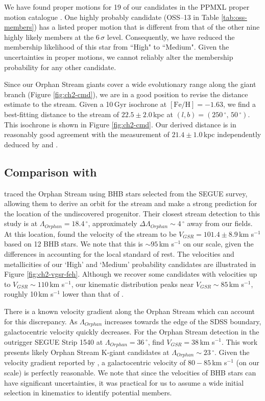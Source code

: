 We have found proper motions for 19 of our candidates in the PPMXL proper motion catalogue \citep{Roeser_et-al_2010}. One highly probably candidate (OSS--13 in Table \ref{tab:oss-members}) has a listed proper motion that is different from that of the other nine highly likely members at the $6\,\sigma$ level. Consequently, we have reduced the membership likelihood of this star from ``High" to ``Medium". Given the uncertainties in proper motions, we cannot reliably alter the membership probability for any other candidate.

Since our Orphan Stream giants cover a wide evolutionary range along the giant branch (Figure \ref{fig:ch2-cmd}), we are in a good position to revise the distance estimate to the stream. Given a 10\,Gyr \citet{Girardi_et-al_2008} isochrone at $[\mbox{Fe/H}] = -1.63$, we find a best-fitting distance to the stream of $22.5 \pm 2.0$\,kpc at $(l, b) = (250\,^\circ,\,50\,^\circ)$. This isochrone is shown in Figure \ref{fig:ch2-cmd}. Our derived distance is in reasonably good agreement with the measurement of $21.4 \pm 1.0$\,kpc independently deduced by \citet{Grillmair_2006} and \citet{Newberg_et-al_2010}.


\subsection{Comparison with \citet{Newberg_et-al_2010}}
\label{sec:ch2-newberg}
\citet{Newberg_et-al_2010} traced the Orphan Stream using BHB stars selected from the SEGUE survey, allowing them to derive an orbit for the stream and make a strong prediction for the location of the undiscovered progenitor. Their closest stream detection to this study is at $\Lambda_{Orphan} = 18.4\,^\circ$, approximately $\Delta\Lambda_{Orphan} \sim 4\,^\circ$ away from our fields. At this location, \citet{Newberg_et-al_2010} found the velocity of the stream to be $V_{GSR} = 101.4 \pm 8.9$\,km s$^{-1}$ based on 12 BHB stars. We note that this is $\sim95$\,km s$^{-1}$ on our scale, given the differences in accounting for the local standard of rest. The velocities and metallicities of our `High' and `Medium' probability candidates are illustrated in Figure \ref{fig:ch2-vgsr-feh}. Although we recover some candidates with velocities up to $V_{GSR} \sim 110$\,km s$^{-1}$, our kinematic distribution peaks near $V_{GSR} \sim 85$\,km s$^{-1}$, roughly 10\,km s$^{-1}$ lower than that of \citet{Newberg_et-al_2010}.

There is a known velocity gradient along the Orphan Stream which can account for this discrepancy. As $\Lambda_{Orphan}$ increases towards the edge of the SDSS boundary, galactocentric velocity quickly decreases. For the Orphan Stream detection in the outrigger SEGUE Strip 1540 at $\Lambda_{Orphan} = 36\,^\circ$, \citet{Newberg_et-al_2010} find $V_{GSR} = 38$\,km s$^{-1}$. This work presents likely Orphan Stream K-giant candidates at $\Lambda_{Orphan} \sim 23\,^\circ$. Given the velocity gradient reported by \citet{Newberg_et-al_2010}, a galactocentric velocity of $80-85$\,km s$^{-1}$ (on our scale) is perfectly reasonable. We note that since the velocities of BHB stars can have significant uncertainties, it was practical for us to assume a wide initial selection in kinematics to identify potential members. 

